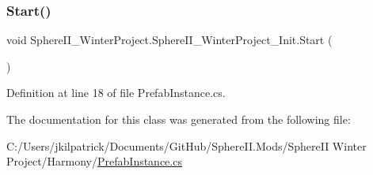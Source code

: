 \subsubsection{\texorpdfstring{Start()}{Start()}}
{\footnotesize\ttfamily void Sphere\+I\+I\+\_\+\+Winter\+Project.\+Sphere\+I\+I\+\_\+\+Winter\+Project\+\_\+\+Init.\+Start (\begin{DoxyParamCaption}{ }\end{DoxyParamCaption})}



Definition at line 18 of file Prefab\+Instance.\+cs.



The documentation for this class was generated from the following file\+:\begin{DoxyCompactItemize}
\item 
C\+:/\+Users/jkilpatrick/\+Documents/\+Git\+Hub/\+Sphere\+I\+I.\+Mods/\+Sphere\+I\+I Winter Project/\+Harmony/\mbox{\hyperlink{_prefab_instance_8cs}{Prefab\+Instance.\+cs}}\end{DoxyCompactItemize}
